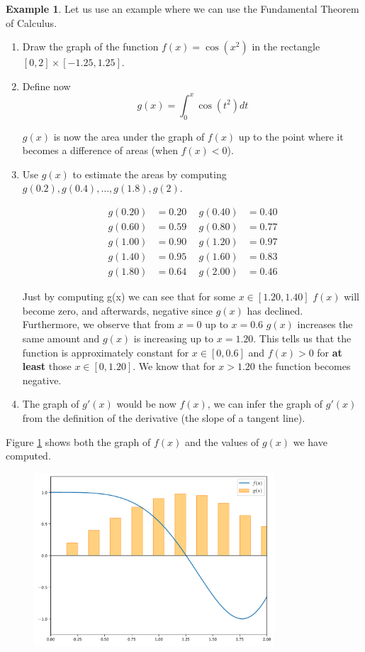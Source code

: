 \documentclass[a4paper,11pt]{article}
\theoremstyle{definition}
\newtheorem{example}{Example}
\theoremstyle{plain}
\begin{document}
\begin{example}
Let us use an example where we can use the Fundamental Theorem of Calculus. 
\begin{enumerate}
	\item Draw the graph of the function \(f(x) = \cos(x^2)\) in the rectangle \([0, 2]\times[-1.25, 1.25]\). 
	\item Define now 
			\[
			g(x) = \int^x_0 \cos(t^2) dt
			\] 

	\(g(x)\) is now the area under the graph of \(f(x)\) up to the point where it becomes a difference of areas (when \(f(x)<0\)). 
	\item Use \(g(x)\) to estimate the areas by computing \(g(0.2), g(0.4),\ldots,g(1.8),g(2)\).

	\begin{align*}
		g(0.20) &= 0.20 \ & \ g(0.40) &= 0.40 \\
		g(0.60) &= 0.59 \ & \ g(0.80) &= 0.77 \\
		g(1.00) &= 0.90 \ & \ g(1.20) &= 0.97 \\
		g(1.40) &= 0.95 \ & \ g(1.60) &= 0.83 \\
		g(1.80) &= 0.64 \ & \ g(2.00) &= 0.46
	\end{align*}

	Just by computing g(x) we can see that for some \(x\in[1.20, 1.40]\) \(f(x)\) will become zero, and afterwards, negative since \(g(x)\) has declined. Furthermore, we observe that from \(x = 0\) up to \(x = 0.6\) \(g(x)\) increases the same amount and \(g(x)\) is increasing up to \(x = 1.20\). This tells us that the function is approximately constant for \(x\in[0,0.6]\) and \(f(x) > 0\) for \textbf{at least} those \(x\in[0, 1.20]\). We know that for \(x > 1.20\) the function becomes negative.

	\item The graph of \(g'(x)\) would be now \(f(x)\), we can infer the graph of \(g'(x)\) from the definition of the derivative (the slope of a tangent line).
\end{enumerate}

Figure \ref{fig:ftc_illustration} shows both the graph of $f(x)$ and the values of $g(x)$ we have computed.
\end{example}

\begin{figure}[htbp]
	\centering 
		\includegraphics[width = 0.8\textwidth]{Ch3_files/Ch3_14_0.pdf}
	\caption{}
	\label{fig:ftc_illustration}
\end{figure}
\end{document}
